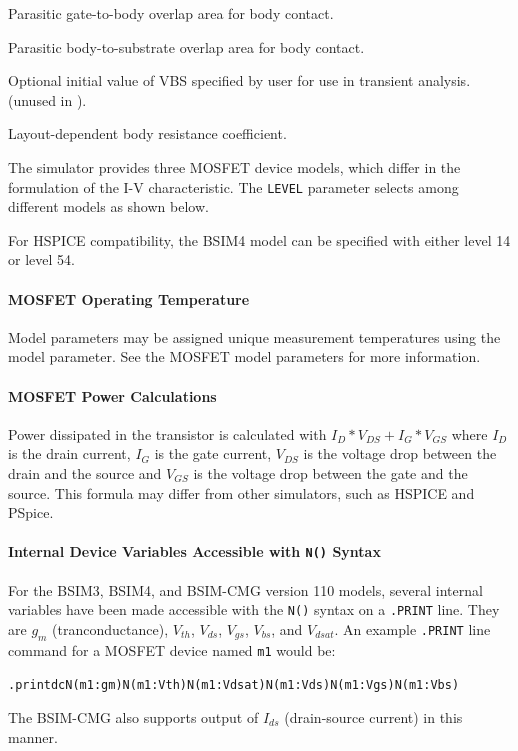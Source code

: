 \begin{Device}
\begin{Parameters}
Parasitic gate-to-body overlap area for body contact.

Parasitic body-to-substrate overlap area for body contact.

Optional initial value of VBS specified by user for use in transient
analysis.  (unused in \Xyce{}).

Layout-dependent body resistance coefficient.

\end{Parameters}

\comments

The simulator provides three MOSFET device models, which differ in the
formulation of the I-V characteristic. The \texttt{LEVEL} parameter
selects among different models as shown below.

For HSPICE compatibility, the BSIM4 model can be specified with either
level 14 or level 54.

\end{Device}

\paragraph{MOSFET Operating Temperature}
Model parameters may be assigned unique measurement temperatures using the
 model parameter. See the MOSFET model parameters for more
information.

\paragraph{MOSFET Power Calculations}
Power dissipated in the transistor is calculated with $I_{D}*V_{DS}+I_{G}*V_{GS}$ where
$I_{D}$ is the drain current, $I_{G}$ is the gate current, $V_{DS}$ is the
voltage drop between the drain and the source and $V_{GS}$ is the voltage drop
between the gate and the source. This formula may differ from other simulators,
such as HSPICE and PSpice.

\paragraph{Internal Device Variables Accessible with {\tt N()} Syntax}
For the BSIM3, BSIM4, and BSIM-CMG version 110 models, several
internal variables have been made accessible with the {\tt N()} syntax
on a {\tt .PRINT} line.  They are $g_{m}$ (tranconductance), $V_{th}$,
$V_{ds}$, $V_{gs}$, $V_{bs}$, and $V_{dsat}$.  An example {\tt .PRINT}
line command for a MOSFET device named {\tt m1} would be:
\begin{alltt}
.print dc N(m1:gm) N(m1:Vth) N(m1:Vdsat) N(m1:Vds) N(m1:Vgs) N(m1:Vbs)
\end{alltt}
The BSIM-CMG also supports output of $I_{ds}$ (drain-source current)
in this manner.

